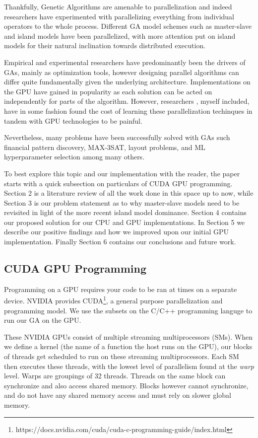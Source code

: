 \documentclass[11pt]{article}       %
\begin{document}
Thankfully, Genetic Algorithms are amenable to parallelization and indeed researchers have experimented with parallelizing everything from individual operators to the whole process. Different GA model schemes such as master-slave and island models have been parallelized, with more attention put on island models for their natural inclination towards distributed execution.


Empirical and experimental researchers have predominantly been the drivers of GAs, mainly as optimization tools, however designing parallel algorithms can differ quite fundamentally given the underlying architecture. Implementations on the GPU have gained in popularity as each solution can be acted on independently for parts of the algorithm. However, researchers \cite{Van_Luong2010-mw}, myself included, have in some fashion found the cost of learning these parallelization techinques in tandem with GPU technologies to be painful.

Nevertheless, many problems have been successfully solved with GAs such financial pattern discovery, MAX-3SAT, layout problems, and ML hyperparameter selection \cite{Shivram2019-il, Amin2022-xd} among many others.

To best explore this topic and our implementation with the reader, the paper starts with a quick subsection on particulars of CUDA GPU programming. Section 2 is a literature review of all the work done in this space up to now, while Section 3 is our problem statement as to why master-slave models need to be revisited in light of the more recent island model dominance. Section 4 contains our proposed solution for our CPU and GPU implementations. In Section 5 we describe our positive findings and how we improved upon our initial GPU implementation. Finally Section 6 contains our conclusions and future work.

\subsection{CUDA GPU Programming}
Programming on a GPU requires your code to be ran at times on a separate device. NVIDIA provides CUDA\footnote{https://docs.nvidia.com/cuda/cuda-c-programming-guide/index.html}, a general purpose parallelization and programming model. We use the subsets on the C/C++ programming languge to run our GA on  the GPU.

These NVIDIA GPUs consist of multiple streaming multiprocessors (SMs). When we define a kernel (the name of a function the host runs on the GPU), our blocks of threads get scheduled to run on these streaming multiprocessors. Each SM then executes these threads, with the lowest level of parallelism found at the \textit{warp} level. Warps are groupings of 32 threads. Threads on the same block can synchronize and also access shared memory. Blocks however cannot synchronize, and do not have any shared memory access and must rely on slower global memory.
\end{document}
